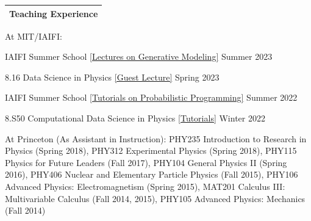 \documentclass[letterpaper,11pt]{article}
\newenvironment{packed_itemize}{
\begin{itemize}[label=\raisebox{0.25ex}{\tiny$\bullet$}]
  \setlength{\itemsep}{4.2pt}
  \setlength{\parskip}{0pt}
  \setlength{\parsep}{0pt}}{\end{itemize}
}
\begin{document}


\noindent
\begin{tabular*}{\textwidth}{l@{\extracolsep{\fill}}}
\large {\sc \Large{Teaching Experience}}\\
\hline
\end{tabular*}\vspace{3.5mm}

\noindent
At MIT/IAIFI:
\begin{packed_itemize}
  \item IAIFI Summer School \href{https://smsharma.io/iaifi-summer-school-2023/}{[Lectures on Generative Modeling]} \hfill Summer 2023
  \item 8.16 Data Science in Physics \href{https://github.com/smsharma/sbi-lecture-mit}{[Guest Lecture]} \hfill Spring 2023
  \item IAIFI Summer School \href{https://github.com/smsharma/iaifi-summer-school-tutorials}{[Tutorials on Probabilistic Programming]} \hfill Summer 2022
  \item 8.S50 Computational Data Science in Physics \href{https://github.com/smsharma/prob-prog-8.S50-tutorial}{[Tutorials]} \hfill Winter 2022
\end{packed_itemize}

\noindent
At Princeton (As Assistant in Instruction):  {\scriptsize PHY235 Introduction to Research in Physics (Spring 2018), PHY312 Experimental Physics (Spring 2018), PHY115 Physics for Future Leaders (Fall 2017), PHY104 General Physics II (Spring 2016), PHY406 Nuclear and Elementary Particle Physics (Fall 2015), PHY106 Advanced Physics: Electromagnetism (Spring 2015), MAT201 Calculus III: Multivariable Calculus (Fall 2014, 2015), PHY105 Advanced Physics: Mechanics (Fall 2014)} \\

\end{document}
